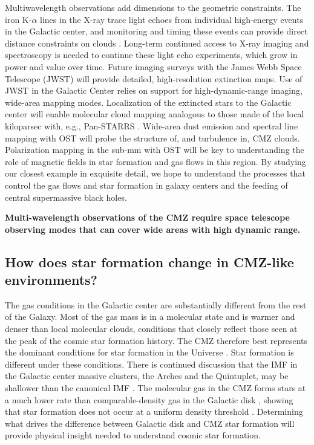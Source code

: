 \documentclass[modern]{aastex62}
\begin{document}
Multiwavelength observations add dimensions to the geometric constraints.
The iron K-$\alpha$ lines in the X-ray trace light echoes from individual
high-energy events in the Galactic center, and monitoring and timing these
events can provide direct distance constraints on clouds
\citep[e.g.,][]{Clavel2014a,Churazov2017b,Churazov2017a,Terrier2018a}.
Long-term continued access to X-ray imaging and spectroscopy is needed to
continue these light echo experiments, which grow in power and value over time.
Future imaging surveys with the James Webb Space Telescope (JWST) will provide
detailed, high-resolution extinction maps.  Use of JWST in the Galactic Center
relies on support for high-dynamic-range imaging, wide-area mapping modes.
Localization of the extincted stars to the Galactic center will enable
molecular cloud mapping analogous to those made of the local kiloparsec with,
e.g., Pan-STARRS \citep{Green2015b}.  Wide-area dust emission and spectral line
mapping with OST will probe the structure of, and turbulence in, CMZ clouds.
Polarization mapping in the sub-mm with OST will be key to understanding the
role of magnetic fields in star formation and gas flows in this region.
By studying our closest example in exquisite detail, we hope to understand the
processes that control the gas flows and star formation in galaxy centers and
the feeding of central supermassive black holes.

\textbf{Multi-wavelength observations of the CMZ require space telescope
observing modes that can cover wide areas with high dynamic range.}

\subsection{How does star formation change in CMZ-like environments?}
The gas conditions in the Galactic center are substantially different from the
rest of the Galaxy.  Most of the gas mass is in a molecular state
\citep[][]{Kennicutt2012a,Mills2017a} and is warmer and denser than local
molecular clouds, conditions that closely reflect those seen at the peak of the
cosmic star formation history.  The CMZ therefore best represents the dominant
conditions for star formation in the Universe \citep{Kruijssen2013a}.  Star
formation is different under these conditions.  There is continued discussion
that the IMF in the Galactic center massive clusters, the Arches and the
Quintuplet, may be shallower than the canonical IMF \citep{Hosek2019a}. The
molecular gas in the CMZ forms stars at a much lower rate than
comparable-density gas in the Galactic disk \citep{Longmore2013b}, showing that
star formation does not occur at a uniform density threshold
\citep{Rathborne2014b,Kruijssen2014c,Walker2018a,Barnes2017b,Ginsburg2018a}.
Determining what drives the difference between Galactic disk and CMZ
star formation will provide physical insight needed to understand
cosmic star formation.
\end{document}
